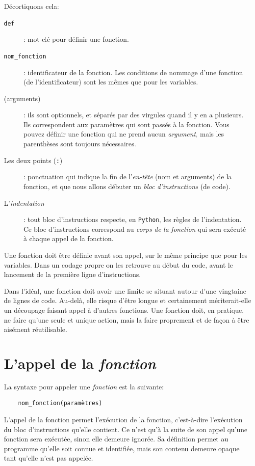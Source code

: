 \documentclass[a4paper,11pt]{book}
\begin{document}
Décortiquons cela:
\begin{description}
	\item[\texttt{def}]: mot-clé pour définir une fonction.
	\item[\texttt{nom\_fonction}]: identificateur de la fonction. Les conditions de nommage d'une fonction (de l'identificateur) sont les mêmes que pour les variables.
	\item[(arguments)]: ils sont optionnels, et séparés par des virgules quand il y en a plusieurs. Ils correspondent aux paramètres qui sont passés à la fonction. Vous pouvez définir une fonction qui ne prend aucun \textit{argument}, mais les parenthèses sont toujours nécessaires.
	\item[Les deux points (\texttt{:})]: ponctuation qui indique la fin de l'\textit{en-tête} (nom et arguments) de la fonction, et que nous allons débuter un \textit{bloc d'instructions} (de code).
	\item[L'\textit{indentation}]: tout bloc d'instructions respecte, en \texttt{Python}, les règles de l'indentation. Ce bloc d'instructions correspond au \textit{corps de la fonction} qui sera exécuté à chaque appel de la fonction.
\end{description}
\medskip

Une fonction doit être définie avant son appel, sur le même principe que pour les variables. Dans un codage \og propre\fg{} on les retrouve au début du code, avant le lancement de la première ligne d'instructions.
\medskip

Dans l'idéal, une fonction doit avoir une limite se situant autour d'une vingtaine de lignes de code. Au-delà, elle risque d'être longue et certainement mériterait-elle un découpage faisant appel à d'autres fonctions. Une fonction doit, en pratique, ne faire qu'une seule et unique action, mais la faire proprement et de façon à être aisément réutilisable.
\medskip

\section{L'appel de la \textit{fonction}}
La syntaxe pour appeler une \textit{fonction} est la suivante:
\begin{verbatim}
    nom_fonction(paramètres)
\end{verbatim}
\medskip

L'appel de la fonction permet l'exécution de la fonction, c'est-à-dire l'exécution du bloc d'instructions qu'elle contient. Ce n'est qu'à la suite de son appel qu'une fonction sera exécutée, sinon elle demeure ignorée. Sa définition permet au programme qu'elle soit connue et identifiée, mais son contenu demeure opaque tant qu'elle n'est pas appelée.
\medskip
\end{document}
